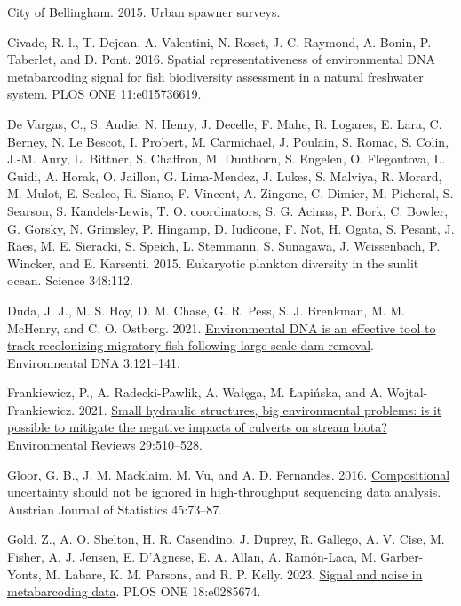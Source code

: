 \documentclass[
]{article}
\newlength{\cslhangindent}
\newlength{\cslentryspacingunit} %
\newenvironment{CSLReferences}[2] %
 {%
  \setlength{\parindent}{0pt}
  \ifodd #1
  \let\oldpar\par
  \def\par{\hangindent=\cslhangindent\oldpar}
  \fi
  \setlength{\parskip}{#2\cslentryspacingunit}
 }%
 {}
\begin{document}
\begin{CSLReferences}{1}{0}
\leavevmode{}%
City of Bellingham. 2015. Urban spawner surveys.

\leavevmode{}%
Civade, R. l., T. Dejean, A. Valentini, N. Roset, J.-C. Raymond, A.
Bonin, P. Taberlet, and D. Pont. 2016. Spatial representativeness of
environmental DNA metabarcoding signal for fish biodiversity assessment
in a natural freshwater system. PLOS ONE 11:e015736619.

\leavevmode{}%
De Vargas, C., S. Audie, N. Henry, J. Decelle, F. Mahe, R. Logares, E.
Lara, C. Berney, N. Le Bescot, I. Probert, M. Carmichael, J. Poulain, S.
Romac, S. Colin, J.-M. Aury, L. Bittner, S. Chaffron, M. Dunthorn, S.
Engelen, O. Flegontova, L. Guidi, A. Horak, O. Jaillon, G. Lima-Mendez,
J. Lukes, S. Malviya, R. Morard, M. Mulot, E. Scalco, R. Siano, F.
Vincent, A. Zingone, C. Dimier, M. Picheral, S. Searson, S.
Kandels-Lewis, T. O. coordinators, S. G. Acinas, P. Bork, C. Bowler, G.
Gorsky, N. Grimsley, P. Hingamp, D. Iudicone, F. Not, H. Ogata, S.
Pesant, J. Raes, M. E. Sieracki, S. Speich, L. Stemmann, S. Sunagawa, J.
Weissenbach, P. Wincker, and E. Karsenti. 2015. Eukaryotic plankton
diversity in the sunlit ocean. Science 348:112.

\leavevmode{}%
Duda, J. J., M. S. Hoy, D. M. Chase, G. R. Pess, S. J. Brenkman, M. M.
McHenry, and C. O. Ostberg. 2021.
\href{https://doi.org/10.1002/edn3.134}{Environmental DNA is an
effective tool to track recolonizing migratory fish following
large-scale dam removal}. Environmental DNA 3:121--141.

\leavevmode{}%
Frankiewicz, P., A. Radecki-Pawlik, A. Wałęga, M. Łapińska, and A.
Wojtal-Frankiewicz. 2021.
\href{https://doi.org/10.1139/er-2020-0126}{Small hydraulic structures,
big environmental problems: is it possible to mitigate the negative
impacts of culverts on stream biota?} Environmental Reviews 29:510--528.

\leavevmode{}%
Gloor, G. B., J. M. Macklaim, M. Vu, and A. D. Fernandes. 2016.
\href{https://doi.org/10.17713/ajs.v45i4.122}{Compositional uncertainty
should not be ignored in high-throughput sequencing data analysis}.
Austrian Journal of Statistics 45:73--87.

\leavevmode{}%
Gold, Z., A. O. Shelton, H. R. Casendino, J. Duprey, R. Gallego, A. V.
Cise, M. Fisher, A. J. Jensen, E. D'Agnese, E. A. Allan, A. Ramón-Laca,
M. Garber-Yonts, M. Labare, K. M. Parsons, and R. P. Kelly. 2023.
\href{https://doi.org/10.1371/journal.pone.0285674}{Signal and noise in
metabarcoding data}. PLOS ONE 18:e0285674.


\end{CSLReferences}
\end{document}
